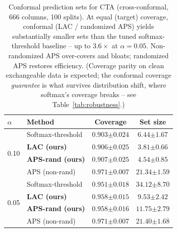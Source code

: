 \begin{table}[t]
\centering
\caption{Conformal prediction sets for CTA (cross-conformal, 666 columns, 100
splits). At equal (target) coverage, conformal (LAC / randomized APS) yields
substantially smaller sets than the tuned softmax-threshold baseline -- up to
$3.6\times$ at $\alpha{=}0.05$. Non-randomized APS over-covers and bloats;
randomized APS restores efficiency. (Coverage parity on clean exchangeable data is
expected; the conformal coverage \emph{guarantee} is what survives distribution
shift, where softmax's coverage breaks -- see Table~\ref{tab:robustness}.)}
\label{tab:conformal}
\begin{tabular}{llcc}
\toprule
$\alpha$ & Method & Coverage & Set size \\
\midrule
\multirow{4}{*}{0.10}
 & Softmax-threshold        & $0.903{\scriptstyle\pm0.024}$ & $6.44{\scriptstyle\pm1.67}$ \\
 & \textbf{LAC (ours)}      & $0.906{\scriptstyle\pm0.025}$ & $\mathbf{3.81}{\scriptstyle\pm0.66}$ \\
 & \textbf{APS-rand (ours)} & $0.907{\scriptstyle\pm0.025}$ & $4.54{\scriptstyle\pm0.85}$ \\
 & APS (non-rand)           & $0.971{\scriptstyle\pm0.007}$ & $21.34{\scriptstyle\pm1.59}$ \\
\midrule
\multirow{4}{*}{0.05}
 & Softmax-threshold        & $0.951{\scriptstyle\pm0.018}$ & $34.12{\scriptstyle\pm8.70}$ \\
 & \textbf{LAC (ours)}      & $0.958{\scriptstyle\pm0.015}$ & $\mathbf{9.53}{\scriptstyle\pm2.42}$ \\
 & \textbf{APS-rand (ours)} & $0.958{\scriptstyle\pm0.016}$ & $11.75{\scriptstyle\pm2.79}$ \\
 & APS (non-rand)           & $0.971{\scriptstyle\pm0.007}$ & $21.40{\scriptstyle\pm1.68}$ \\
\bottomrule
\end{tabular}
\end{table}
